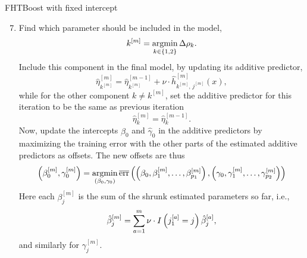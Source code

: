 \begin{algorithm}
\caption{FHTBoost with fixed intercept}
\label{algo:fhtboost-with-intercept}
\begin{enumerate}
    \setcounter{enumi}{6}
    \item
        Find which parameter should be included in the model,
        \begin{equation*}
            k^{[m]}=\operatorname*{argmin}_{k\in\{1,2\}}\Delta\rho_k.
        \end{equation*}
        Include this component in the final model, by updating its additive predictor,
        \begin{equation*}
            \hat{\eta}^{[m]}_{k^{[m]}}=\hat{\eta}^{[m-1]}_{k^{[m]}}+\nu\cdot\hat{h}^{[m]}_{k^{[m]},\,j^{[m]}}(x),
        \end{equation*}
        while for the other component $k\neq k^{[m]}$, set the additive predictor for this iteration to be the same as previous iteration
        \begin{equation*}
            \hat{\eta}^{[m]}_{k}=\hat{\eta}^{[m-1]}_{k}.
        \end{equation*}
        Now, update the intercepts $\hat{\beta}_0$ and $\hat{\gamma}_0$ in the additive predictors by maximizing the training error with the other parts of the estimated additive predictors as offsets.
        The new offsets are thus
        \begin{equation*}
            \left(\beta_0^{[m]},\gamma_0^{[m]}\right)=\operatorname*{argmin}_{\left(\beta_0,\gamma_0\right)}
            \overline{\text{err}}
                \left(
                    \left(
                        \beta_0,\beta^{[m]}_1,\ldots,\beta^{[m]}_{p_1}
                    \right),
                    \left(
                        \gamma_0,\gamma^{[m]}_1,\ldots,\gamma^{[m]}_{p_2}
                    \right)
                \right)
        \end{equation*}
        Here each $\beta_j^{[m]}$ is the sum of the shrunk estimated parameters so far, i.e.,
        \begin{equation*}
            \hat{\beta}_j^{[m]}=\sum_{a=1}^{m}\nu\cdot I\left(j_1^{[a]}=j\right)\hat{\beta}_j^{[a]},
        \end{equation*}
        and similarly for $\gamma_j^{[m]}$.
\end{enumerate}
\end{algorithm}